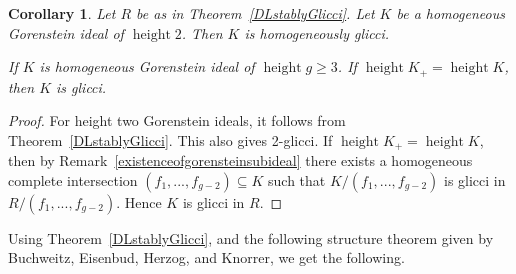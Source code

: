 \documentclass[11pt,letterpaper]{amsart}
\newcommand{\seq}{\subseteq}
\DeclareMathOperator{\height}{height}
\theoremstyle{plain}
\newtheorem{cor}[thm]{Corollary}
\theoremstyle{definition}
\theoremstyle{remark}
\begin{document}
\begin{cor}\label{Gorensteinidealsareglicci} Let $R$ be as in Theorem~\ref{DLstablyGlicci}. Let $K$ be a homogeneous Gorenstein ideal of $\height 2$. Then $K$ is homogeneously glicci.   

 If $K$ is homogeneous Gorenstein ideal of $\height g\ge 3$. If $\height K_+=\height K$, then $K$ is glicci. 
\end{cor}
\begin{proof}
For height two Gorenstein ideals, it follows from Theorem~\ref{DLstablyGlicci}. This also gives 2-glicci. If $\height K_+=\height K$, then by Remark~\ref{existenceofgorensteinsubideal} there exists a homogeneous complete intersection $(f_1,...,f_{g-2})\seq K$ such that $K/(f_1,...,f_{g-2})$ is glicci in $R/(f_1,...,f_{g-2})$. Hence $K$ is glicci in $R$. 
\end{proof}

Using Theorem~\ref{DLstablyGlicci}, and the following structure theorem given by Buchweitz, Eisenbud, Herzog, and Knorrer, we get the following. 
\end{document}
